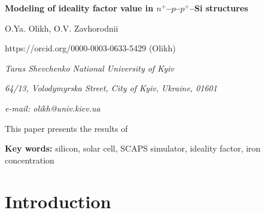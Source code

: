 \documentclass[12pt]{article}
\begin{document}

\begin{center}

{\bfseries Modeling of ideality factor value in $n^+$--$p$--$p^+$--Si structures}

O.Ya. Olikh, O.V. Zavhorodnii

https://orcid.org/0000-0003-0633-5429 (Olikh)

\emph{Taras Shevchenko National University of Kyiv}

\emph{64/13, Volodymyrska Street, City of Kyiv, Ukraine, 01601}

\emph{e-mail: olikh@univ.kiev.ua}

\end{center}

This paper presents the results of

\textbf{Key words:}
silicon, solar cell, SCAPS simulator, ideality factor, iron concentration


\section{Introduction}
\end{document}
